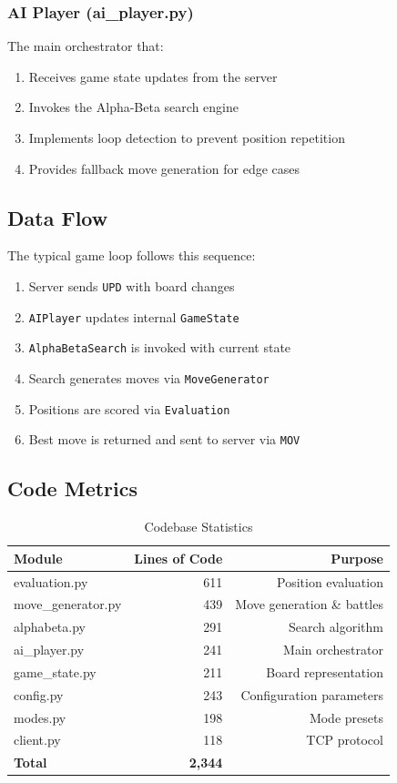 \documentclass[11pt,a4paper]{article}
\begin{document}
\subsubsection{AI Player (ai\_player.py)}

The main orchestrator that:
\begin{enumerate}
    \item Receives game state updates from the server
    \item Invokes the Alpha-Beta search engine
    \item Implements loop detection to prevent position repetition
    \item Provides fallback move generation for edge cases
\end{enumerate}

\subsection{Data Flow}

The typical game loop follows this sequence:

\begin{enumerate}
    \item Server sends \texttt{UPD} with board changes
    \item \texttt{AIPlayer} updates internal \texttt{GameState}
    \item \texttt{AlphaBetaSearch} is invoked with current state
    \item Search generates moves via \texttt{MoveGenerator}
    \item Positions are scored via \texttt{Evaluation}
    \item Best move is returned and sent to server via \texttt{MOV}
\end{enumerate}

\subsection{Code Metrics}

\begin{table}[H]
\centering
\caption{Codebase Statistics}
\label{tab:code_metrics}
\begin{tabular}{@{}lrr@{}}
\toprule
\textbf{Module} & \textbf{Lines of Code} & \textbf{Purpose} \\
\midrule
evaluation.py & 611 & Position evaluation \\
move\_generator.py & 439 & Move generation \& battles \\
alphabeta.py & 291 & Search algorithm \\
ai\_player.py & 241 & Main orchestrator \\
game\_state.py & 211 & Board representation \\
config.py & 243 & Configuration parameters \\
modes.py & 198 & Mode presets \\
client.py & 118 & TCP protocol \\
\midrule
\textbf{Total} & \textbf{2,344} & \\
\bottomrule
\end{tabular}
\end{table}
\end{document}
